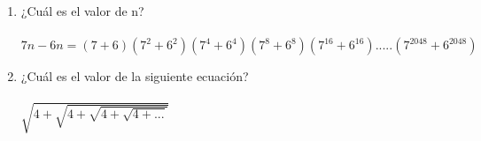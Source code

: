 \documentclass{article}
\begin{document}
\begin{enumerate}
{\begin{center}
\begin{tikzpicture}
              \end{tikzpicture}
          \end{center}}
    \item ¿Cuál es el valor de n?  \\~\\ $7n-6n=(7+6)(7^2+6^2)(7^4+6^4)(7^8+6^8)(7^{16}+6^{16}).....(7^{2048}+6^{2048})$
    \item ¿Cuál es el valor de la siguiente ecuación? \\~\\ $\sqrt{4+\sqrt{4+\sqrt{4+\sqrt{4+...}}}}$



\end{enumerate}
\end{document}
